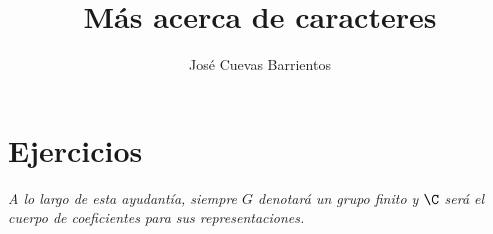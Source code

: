 \documentclass[11pt, reqno]{amsart}
\title{Más acerca de caracteres}
\date{\DTMdate{2025-10-08}}
\author{José Cuevas Barrientos}
\begin{document}
\maketitle

\section{Ejercicios}
\begin{center}
	\slshape
	A lo largo de esta ayudantía, siempre $G$ denotará un grupo finito y $\C$ será el cuerpo de coeficientes para sus representaciones.
\end{center}




\end{document}
